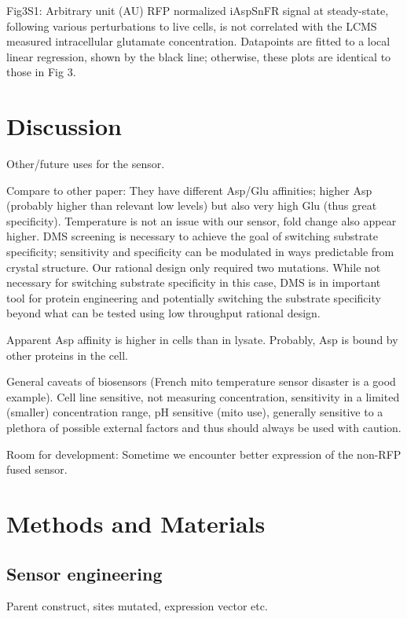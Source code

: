 \documentclass[9pt,lineno]{elife}
\begin{document}
Fig3S1:
Arbitrary unit (AU) RFP normalized iAspSnFR signal at steady-state, following various perturbations to live cells, is not correlated with the LCMS measured intracellular glutamate concentration. Datapoints are fitted to a local linear regression, shown by the black line; otherwise, these plots are identical to those in Fig 3.








\section{Discussion}
Other/future uses for the sensor.

Compare to other paper:
They have different Asp/Glu affinities; higher Asp (probably higher than relevant low levels) but also very high Glu (thus great specificity). Temperature is not an issue with our sensor, fold change also appear higher.
DMS screening is necessary to achieve the goal of switching substrate specificity; sensitivity and specificity can be modulated in ways predictable from crystal structure. Our rational design only required two mutations. While not necessary for switching substrate specificity in this case, DMS is in important tool for protein engineering and potentially switching the substrate specificity beyond what can be tested using low throughput rational design.

Apparent Asp affinity is higher in cells than in lysate. Probably, Asp is bound by other proteins in the cell.

General caveats of biosensors (French mito temperature sensor disaster is a good example). Cell line sensitive, not measuring concentration, sensitivity in a limited (smaller) concentration range, pH sensitive (mito use), generally sensitive to a plethora of possible external factors and thus should always be used with caution.

Room for development:
Sometime we encounter better expression of the non-RFP fused sensor.










\section{Methods and Materials}

\subsection{Sensor engineering}
Parent construct, sites mutated, expression vector etc.
\end{document}
